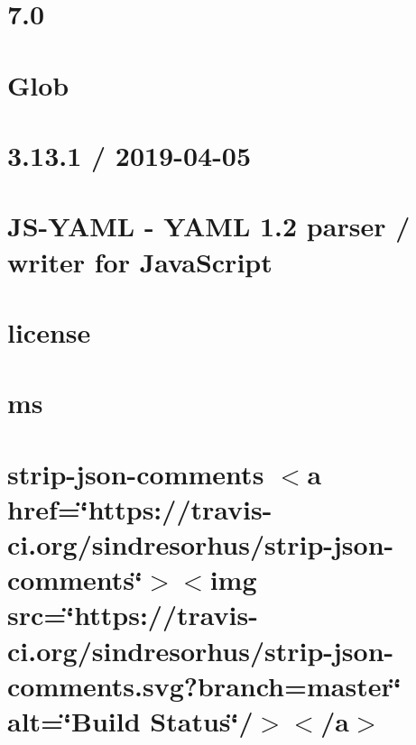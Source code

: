 \let\mypdfximage\pdfximage\def\pdfximage{\immediate\mypdfximage}\documentclass[twoside]{book}
\newcommand{\+}{\discretionary{\mbox{\scriptsize$\hookleftarrow$}}{}{}}
\begin{document}
\chapter{7.0}
\label{md_heap-visualizer_node_modules_mocha_node_modules_glob_changelog}

\chapter{Glob}
\label{md_heap-visualizer_node_modules_mocha_node_modules_glob__r_e_a_d_m_e}

\chapter{3.13.1 / 2019-\/04-\/05}
\label{md_heap-visualizer_node_modules_mocha_node_modules_js-yaml__c_h_a_n_g_e_l_o_g}

\chapter{J\+S-\/\+Y\+A\+ML -\/ Y\+A\+ML 1.2 parser / writer for Java\+Script}
\label{md_heap-visualizer_node_modules_mocha_node_modules_js-yaml__r_e_a_d_m_e}

\chapter{license}
\label{md_heap-visualizer_node_modules_mocha_node_modules_ms_license}

\chapter{ms}
\label{md_heap-visualizer_node_modules_mocha_node_modules_ms_readme}

\chapter{strip-\/json-\/comments $<$a href=\char`\"{}https\+://travis-\/ci.\+org/sindresorhus/strip-\/json-\/comments\char`\"{}$>$$<$img src=\char`\"{}https\+://travis-\/ci.\+org/sindresorhus/strip-\/json-\/comments.\+svg?branch=master\char`\"{} alt=\char`\"{}\+Build Status\char`\"{}/$>$$<$/a$>$}
\label{md_heap-visualizer_node_modules_mocha_node_modules_strip-json-comments_readme}

\end{document}
